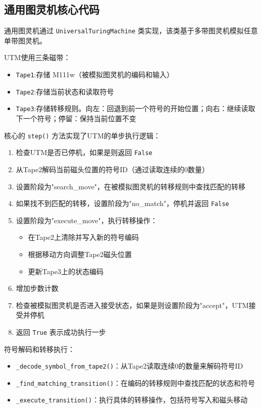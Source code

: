 \documentclass{sysucseexp}
\begin{document}
\subsection{通用图灵机核心代码}


通用图灵机通过 \texttt{UniversalTuringMachine} 类实现，该类基于多带图灵机模拟任意单带图灵机。

UTM使用三条磁带：
\begin{itemize}
    \item \texttt{Tape1}:存储 M111w（被模拟图灵机的编码和输入）
    \item \texttt{Tape2}:存储当前状态和读取符号
    \item \texttt{Tape3}:存储转移规则。向左：回退到前一个符号的开始位置；向右：继续读取下一个符号；停留：保持当前位置不变
\end{itemize}

核心的 \texttt{step()} 方法实现了UTM的单步执行逻辑：

\begin{enumerate}
    \item 检查UTM是否已停机，如果是则返回 \texttt{False}
    \item 从Tape2解码当前磁头位置的符号ID（通过读取连续的0数量）
    \item 设置阶段为"search\_move"，在被模拟图灵机的转移规则中查找匹配的转移
    \item 如果找不到匹配的转移，设置阶段为"no\_match"，停机并返回 \texttt{False}
    \item 设置阶段为"execute\_move"，执行转移操作：
    \begin{itemize}
        \item 在Tape2上清除并写入新的符号编码
        \item 根据移动方向调整Tape2磁头位置
        \item 更新Tape3上的状态编码
    \end{itemize}
    \item 增加步数计数
    \item 检查被模拟图灵机是否进入接受状态，如果是则设置阶段为"accept"，UTM接受并停机
    \item 返回 \texttt{True} 表示成功执行一步
\end{enumerate}

符号解码和转移执行：
\begin{itemize}
    \item \texttt{\_decode\_symbol\_from\_tape2()}：从Tape2读取连续0的数量来解码符号ID
    \item \texttt{\_find\_matching\_transition()}：在编码的转移规则中查找匹配的状态和符号
    \item \texttt{\_execute\_transition()}：执行具体的转移操作，包括符号写入和磁头移动
\end{itemize}
\end{document}

